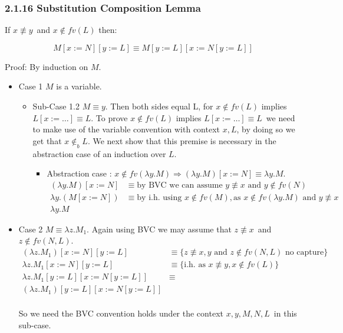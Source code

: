 \documentclass{article}
\newcommand{\lamb}{\ensuremath{\lambda}}
\newcommand{\ninb}{\ensuremath{\not\in_b}}
\newcommand{\lam}{\ensuremath{\lambda}}
\begin{document}
\subsubsection*{2.1.16 Substitution Composition Lemma}

If $x \not\equiv y$\ and $x \not\in fv(L)$ then:

\[ M [x:=N][y:=L] \equiv M[y:=L][x:=N[y:=L]] \]

Proof: By induction on $M$.
\begin{itemize}
\item{Case 1} $M$ is a variable.
  \begin{itemize}
  \item{Sub-Case 1.2} $M \equiv y$. Then both sides equal L, for $x \not\in fv(L)$ implies $L[x:=\dots]\equiv L$.
    To prove $x \not\in fv(L)$ implies $L[x:=\dots]\equiv L$\ we need to make use of the variable convention with context $x,L$, by doing so we get that $x \ninb L$. We next show that this premise is necessary in the abstraction case of an induction over $L$.

\begin{itemize}
\item Abstraction case : $x \not\in fv(\lam y . M) \Rightarrow (\lam y . M)[ x := N] \equiv \lam y . M$.
  \[\begin{array}{ll}
      (\lam y . M)[ x := N] & \equiv \text{by BVC we can assume } y \not\equiv x \text{ and } y \not\in fv(N) \\
      \lam y . (M [ x := N]) & \equiv \text{by i.h. using } x \not\in fv(M), \text{as } x \not\in fv(\lam y . M) \text{ and } y \not\equiv x \\
      \lam y . M
  \end{array}\]
\end{itemize}

  \end{itemize}
\item{Case 2} $M \equiv \lamb z . M_1$. Again using BVC we may assume that $z \not\equiv x$\ and $z \not\in fv(N,L)$.
\[ \begin{array}{rl}
     (\lam z. M_1)[x:=N][y:=L]      & \equiv  \{z \not\equiv x, y \text{ and } z \not\in fv(N,L) \text{ no capture}\} \\
     \lam z . M_1[x:=N][y:=L]       & \equiv  \{\text{i.h. as } x \not\equiv y, x \not\in fv(L) \} \\
     \lam z . M_1[y:=L][x:=N[y:=L]] & \equiv  \\
     (\lam z . M_1) [y:=L][x:=N[y:=L]] & \\
  \end{array}\]

  So we need the BVC convention holds under the context $x,y,M,N,L$\ in this sub-case.
\end{itemize}
\end{document}
